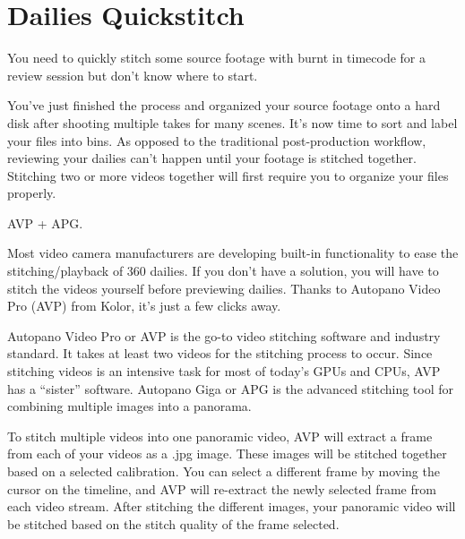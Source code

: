 \chapter{Dailies Quickstitch}
\pagecolor{white}
\label{chap:30}
\begin{fullwidth}

\problem

{\large You need to quickly stitch some source footage with burnt in timecode for a review session but don't know where to start. \par}

You've just finished the \textbf{} process and organized your source footage onto a hard disk after shooting multiple takes for many scenes. It's now time to sort and label your files into bins. As opposed to the traditional post-production workflow, reviewing your dailies can't happen until your footage is stitched together. Stitching two or more videos together will first require you to organize your files properly.

\solution

{\large AVP + APG. \par}

Most video camera manufacturers are developing built-in functionality to ease the stitching/playback of 360 dailies. If you don't have a \textbf{} solution, you will have to stitch the videos yourself before previewing dailies. Thanks to Autopano Video Pro (AVP) from Kolor, it's just a few clicks away.

Autopano Video Pro or AVP is the go-to video stitching software and industry standard. It takes at least two videos for the stitching process to occur. Since stitching videos is an intensive task for most of today’s GPUs and CPUs, AVP has a “sister” software. Autopano Giga or APG is the advanced stitching tool for combining multiple images into a panorama. 

To stitch multiple videos into one panoramic video, AVP will extract a frame from each of your videos as a .jpg image. These images will be stitched together based on a selected calibration. You can select a different frame by moving the cursor on the timeline, and AVP will re-extract the newly selected frame from each video stream. After stitching the different images, your panoramic video will be stitched based on the stitch quality of the frame selected. 



\end{fullwidth}
